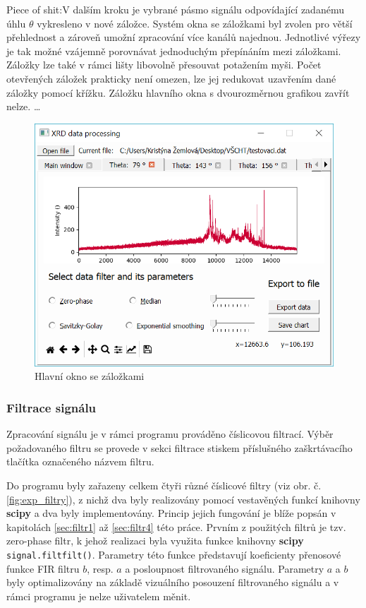 \documentclass[a4paper, 12pt]{article}
\begin{document}
Piece of shit:\textcolor{cdorange}{V dalším kroku je vybrané pásmo signálu odpovídající zadanému úhlu $\theta$ vykresleno v nové záložce. Systém okna se záložkami byl zvolen pro větší přehlednost a zároveň umožní zpracování více kanálů najednou. Jednotlivé výřezy je tak možné vzájemně porovnávat jednoduchým přepínáním mezi záložkami. Záložky lze také v rámci lišty libovolně přesouvat potažením myši. Počet otevřených záložek prakticky není omezen, lze jej redukovat uzavřením dané záložky pomocí křížku. Záložku hlavního okna s dvourozměrnou grafikou zavřít nelze.}
\vskip 0.3in
\ldots
\vskip 0.3in
\begin{figure}[hbt!]
    \centering
    \includegraphics[width=\linewidth]{gui_tab.png}
    \caption{Hlavní okno se záložkami}
    \label{fig:gui_tab}
\end{figure}

\subsubsection{Filtrace signálu}\label{sec:exp_filtrace}
Zpracování signálu je v rámci programu prováděno číslicovou filtrací. Výběr požadovaného filtru se provede v sekci filtrace stiskem příslušného zaškrtávacího tlačítka označeného názvem filtru.

\noindent Do programu byly zařazeny celkem čtyři různé číslicové filtry (viz obr. č. \ref{fig:exp_filtry}), z nichž dva byly realizovány pomocí vestavěných funkcí knihovny \textbf{scipy} a dva byly implementovány. Princip jejich fungování je blíže popsán v kapitolách \ref{sec:filtr1} až \ref{sec:filtr4} této práce.
\vskip 0.1in
\noindent Prvním z použitých filtrů je tzv. zero-phase filtr, k jehož realizaci byla využita funkce knihovny \textbf{scipy} \texttt{signal.filtfilt()}. Parametry této funkce představují koeficienty přenosové funkce FIR filtru $b$, resp. $a$ a posloupnost filtrovaného signálu. Parametry $a$ a $b$ byly optimalizovány na základě vizuálního posouzení filtrovaného signálu a v rámci programu je nelze uživatelem měnit.
\end{document}

